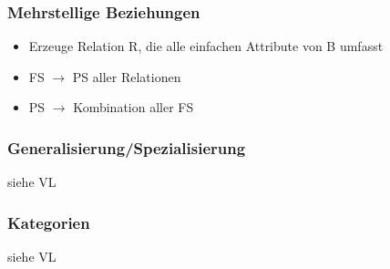 \subsubsection{Mehrstellige Beziehungen}
\begin{itemize}
	\item Erzeuge Relation R, die alle einfachen Attribute von B umfasst
	\item FS $\to$ PS aller Relationen
	\item PS $\to$ Kombination aller FS
\end{itemize}
\subsubsection{Generalisierung/Spezialisierung}
siehe VL
\subsubsection{Kategorien}
siehe VL